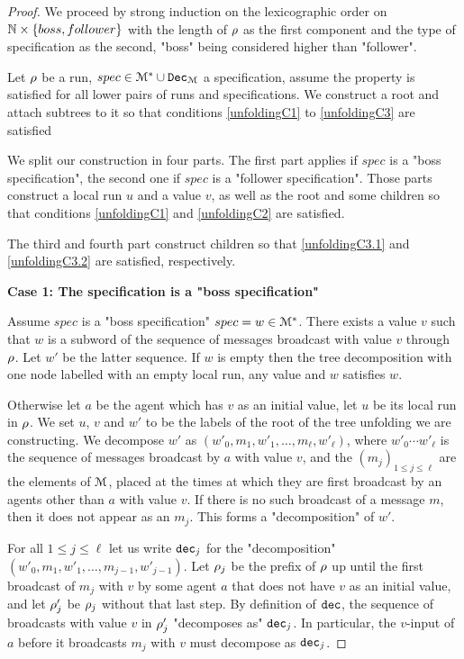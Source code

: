 \ifproofs
\begin{proof}
	
	We proceed by strong induction on the lexicographic order on $\mathbb{N} \times \{boss, follower\}$ with the length of $\rho$ as the first component and the type of specification as the second, "boss" being considered higher than "follower". 
	
	Let $\rho$ be a run, $\spec \in \messages^* \cup \decset{\messages}$ a specification, assume the property is satisfied for all lower pairs of runs and specifications. We construct a root and attach subtrees to it so that conditions \ref{unfoldingC1} to \ref{unfoldingC3} are satisfied 
	
	We split our construction in four parts. The first part applies if $spec$ is a "boss specification", the second one if $spec$ is a "follower specification". 
	Those parts construct a local run $u$ and a value $v$, as well as the root and some children so that conditions \ref{unfoldingC1} and \ref{unfoldingC2} are satisfied.
	
	The third and fourth part construct children so that \ref{unfoldingC3.1} and \ref{unfoldingC3.2} are satisfied, respectively.
	
	\textbf{Case 1: The specification is a "boss specification"}
	
	Assume $spec$ is a "boss specification" $spec = w \in \mathcal{M}^*$.
	There exists a value $v$ such that $w$ is a subword of the sequence of messages broadcast with value $v$ through $\rho$. Let $w'$ be the latter sequence.
	If $w$ is empty then the tree decomposition with one node labelled with an empty local run, any value and $w$ satisfies $w$.	
	
	Otherwise let $a$ be the agent which has $v$ as an initial value, let $u$ be its local run in $\rho$. We set $u$, $v$ and $w'$ to be the labels of the root of the tree unfolding we are constructing.
	We decompose $w'$ as $(w'_0, m_1, w'_1, \ldots, m_\ell, w'_\ell)$, where $w'_0\cdots w'_\ell$ is the sequence of messages broadcast by $a$ with value $v$, and the $(m_j)_{1\leq j\leq \ell}$ are the elements of $\mathcal{M}$, placed at the times at which they are first broadcast by an agents other than $a$ with value $v$. If there is no such broadcast of a message $m$, then it does not appear as an $m_j$. This forms a "decomposition" of $w'$.
		
	For all $1 \leq j \leq \ell$ let us write $\mathtt{dec}_j$ for the "decomposition" $(w'_0, m_1, w'_1, \ldots, m_{j-1}, w'_{j-1})$. Let $\rho_j$ be the prefix of $\rho$ up until the first broadcast of $m_j$ with $v$ by some agent $a$ that does not have $v$ as an initial value, and let $\rho'_j$ be $\rho_j$ without that last step. By definition of $\mathtt{dec}$, the sequence of broadcasts with value $v$ in $\rho'_j$ "decomposes as" $\mathtt{dec}_j$.
	In particular, the $v$-input of $a$ before it broadcasts $m_j$ with $v$ must decompose as $\mathtt{dec}_j$.
	 

\end{proof}
